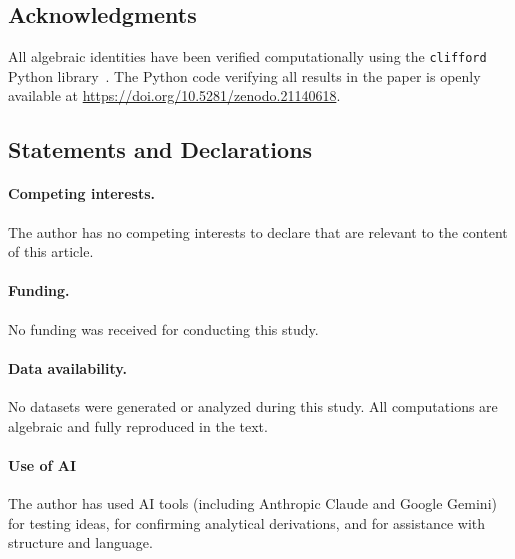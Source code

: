 \documentclass{birkjour}
\theoremstyle{definition}
\theoremstyle{remark}
\numberwithin{equation}{section}
\providecommand{\rev}{{}}
\begin{document}
\subsection*{Acknowledgments}
All algebraic identities have been verified computationally
using the \texttt{clifford} Python
library~\cite{clifford-python}. \rev{The Python code
verifying all results in the paper is openly available at
\url{https://doi.org/10.5281/zenodo.21140618}.}



\subsection*{Statements and Declarations}

\paragraph{Competing interests.}
The author has no competing interests to declare that are relevant
to the content of this article.

\paragraph{Funding.}
No funding was received for conducting this study.

\paragraph{Data availability.}
No datasets were generated or analyzed during this study.
All computations are algebraic and fully reproduced in the text.

\paragraph{Use of AI}
\rev{The author has used AI tools (including Anthropic
Claude and Google Gemini) for testing ideas, for confirming
analytical derivations, and for assistance with structure
and language.}
\end{document}
